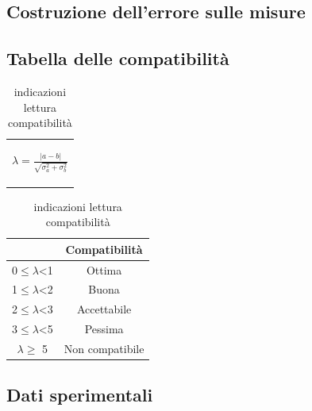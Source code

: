 \documentclass{article}
\begin{document}
\subsection{Costruzione dell'errore sulle misure}
\label{Calcerr}

\subsection{Tabella delle compatibilità}
\medskip
\begin{table}[H]
    \centering
    \begin{tabular}{c}
        \begin{Large}
        $\lambda=\frac{|a-b|}{\sqrt{\sigma_a^2+\sigma_b^2}}$
        \end{Large}\\
    \end{tabular}
    \hspace{0.5cm}
    \begin{tabular}{cc}
        \toprule
        &       \textbf{Compatibilità   }       \\
        \midrule
        0$\leq \lambda$<1   &Ottima                 \\
        1$\leq \lambda$<2   &Buona                  \\
        2$\leq \lambda$<3   &Accettabile            \\
        3$\leq\lambda$<5   &Pessima                \\
        $ \lambda \geq $  5     &Non compatibile        \\
        \bottomrule
    \end{tabular}
    \caption{indicazioni lettura compatibilità}
    \label{tab:compatibilità}
\end{table}

\subsection{Dati sperimentali}


   
\end{document}
